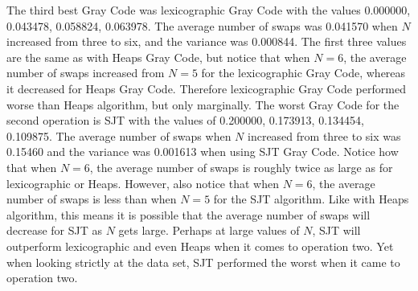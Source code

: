 The third best Gray Code was lexicographic Gray Code with the values 0.000000, 0.043478, 0.058824, 0.063978. 
The average number of swaps was 0.041570 when $N$ increased from three to six, and the variance was 
0.000844. The first three values are the same as with Heaps Gray Code, but notice that when $N=6$, the average 
number of swaps increased from $N=5$ for the lexicographic Gray Code, whereas it decreased for Heaps Gray Code.
Therefore lexicographic Gray Code performed worse than Heaps algorithm, but only marginally. The worst Gray Code for 
the second operation is SJT with the values of 0.200000, 0.173913, 0.134454, 0.109875. The average number of 
swaps when $N$ increased from three to six was 0.15460 and the variance was 0.001613 when using SJT Gray Code.
Notice how that when $N=6$, the average number of swaps is roughly twice as large as for lexicographic or Heaps.
However, also notice that when $N=6$, the average number of swaps is less than when $N=5$ 
for the SJT algorithm. Like with Heaps algorithm, this means it is possible that the average number 
of swaps will decrease for SJT as $N$ gets large. Perhaps at large values of $N$, SJT will outperform 
lexicographic and even Heaps when it comes to operation two. Yet when looking strictly at the data set, 
SJT performed the worst when it came to operation two.

